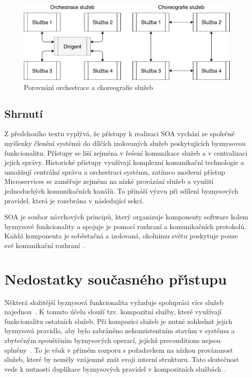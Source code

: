 \begin{figure}
    \centering
    \includegraphics[keepaspectratio=true, width=0.8\linewidth]{figures/choreography-orchestration.pdf}
    \caption{Porovnán\'{\i} orchestrace a choreografie služeb}
    \label{fig:choreography-orchestration}
\end{figure}

\subsection{Shrnutí}

Z předchozího textu vyplývá, že přístupy k realizaci \gls{SOA} vychází ze společné
myšlenky členění systémů do dílčích izolovaných služeb poskytujících byznysovou funkcionalitu.
Přístupy se liší zejména v řešení komunikace služeb a v centralizaci jejich správy.
Historické přístupy využívají komplexní komunikační technologie a umožňují centrální
správu a orchestraci systému, zatímco moderní přístup Microservices se zaměřuje zejména
na nízké provázání služeb a využití jednoduchých komunikačních kanálů.
To přináší výzvu při sdílení byznysových pravidel, která je rozebrána v následující sekci.

\begin{definition}
    \gls{SOA} je soubor návrhových principů, který organizuje komponenty software
    kolem byznysové funkcionality a spojuje je pomocí rozhraní a komunikačních protokolů.
    Každá komponenta je soběstačná a izolovaná, okolnímu světu poskytuje pouze
    své komunikační rozhraní~\cite{lewis2014microservices, papazoglou2003service}.
\end{definition}

\section{Nedostatky současného př\'{\i}stupu}\label{sec:shortcomings}

Některá složitější byznysová funkcionalita vyžaduje spolupráci více služeb
najednou~\cite{papazoglou2003service}. K tomuto účelu slouží tzv. kompozitní
služby, které využívají funkcionalitu ostatních služeb. Při kompozici služeb je nutné
zohlednit jejich byznysová pravidla, aby bylo zabráněno nekonzistentním stavům v systému
a zbytečným spouštěním byznysových operací, jejichž preconditions nejsou
splněny~\cite{cerny2017disambiguation}. To je však v přímém rozporu s požadavkem na nízkou
provázanost služeb, které by neměly vzájemně znát svoji interní strukturu. Tato skutečnost
vede k nutnosti duplikace byznysových pravidel v kompozitních službách~\cite{cerny2016survey}.

